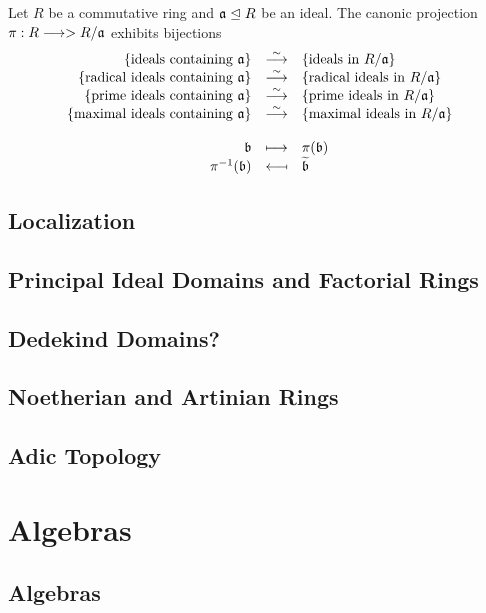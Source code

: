 	\begin{theorem}
		Let $R$ be a commutative ring and $\mathfrak{a} \trianglelefteq R$ be an ideal. The canonic projection $\pi: R -->> R/\mathfrak{a}$ exhibits bijections
		\begin{equation*}
			\begin{array}{rcl}
				\{\text{ideals containing }\ideal{a}\} &\overset{\sim}{\longrightarrow} &\{\text{ideals in } R/\ideal{a}\}\\
				\{\text{radical ideals containing }\ideal{a}\} &\overset{\sim}{\longrightarrow} &\{\text{radical ideals in } R/\ideal{a}\}\\
				\{\text{prime ideals containing }\ideal{a}\} &\overset{\sim}{\longrightarrow} &\{\text{prime ideals in } R/\ideal{a}\}\\
				\{\text{maximal ideals containing }\ideal{a}\} &\overset{\sim}{\longrightarrow} &\{\text{maximal ideals in } R/\ideal{a}\}\\\\
				\ideal{b} &\longmapsto &\pi(\ideal{b})\\
				\pi^{-1}(\ideal{b}) &\reflectbox{$\longmapsto$} &\widetilde{\ideal{b}}
			\end{array}
		\end{equation*}
	\end{theorem}

	\subsection{Localization}
	\subsection{Principal Ideal Domains and Factorial Rings}
	\subsection{Dedekind Domains?}
	\subsection{Noetherian and Artinian Rings}
	\subsection{Adic Topology}
	\section{Algebras}
	\subsection{Algebras}

